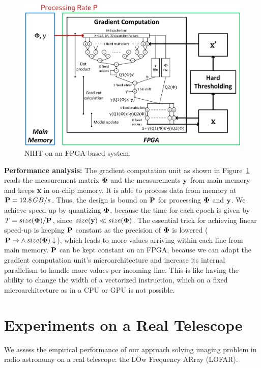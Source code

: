 \documentclass{article}
\begin{document}
\begin{figure}[h!]
\centering
\includegraphics[width=0.9\columnwidth, angle=0]{figs/niht_fpga.eps}
\caption{NIHT on an FPGA-based system.}
\label{fig:fpga}
\end{figure}


{\bf Performance analysis:} The gradient computation unit as shown in Figure~\ref{fig:fpga} reads the measurement matrix ${\bf \Phi}$ and the measurements ${\bf y}$ from main memory and keeps {\bf x} in on-chip memory. It is able to process data from memory at ${\bf P}=12.8\,GB/s$. Thus, the design is bound on ${\bf P}$ for processing ${\bf \Phi}$ and ${\bf y}$. We achieve speed-up by quantizing ${\bf \Phi}$, because the time for each epoch is given by
$T = size({\bf \Phi})/{\bf P}$, since $size({\bf y}) \ll size({\bf \Phi})$. The essential trick for achieving linear speed-up is keeping ${\bf P}$ constant as the precision of ${\bf \Phi}$ is lowered (${\bf P}\to \land \, size({\bf \Phi})\downarrow$), which leads to more values arriving within each line from main memory. ${\bf P}$ can be kept constant on an FPGA, because we can adapt the gradient computation unit's microarchitecture and increase its internal parallelism to handle more values per incoming line. This is like having the ability to change the width of a vectorized instruction, which on a fixed microarchitecture as in a CPU or GPU is not possible.



\section{Experiments on a Real Telescope}\label{section_experiments}
We assess the empirical performance of our approach solving imaging problem in radio astronomy on a real telescope: the LOw Frequency ARray (LOFAR).
\end{document}
